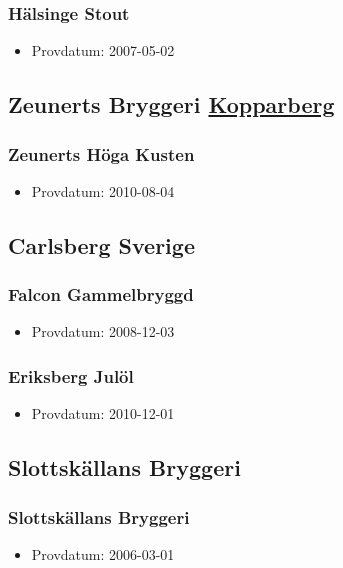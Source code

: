 \documentclass[11pt]{article}
\begin{document}
\subsubsection{Hälsinge Stout}
\label{sec:org5e0b851}
\begin{itemize}
\item Provdatum: 2007-05-02
\end{itemize}
\subsection{Zeunerts Bryggeri \underline{Kopparberg}}
\label{sec:org892e3bc}
\subsubsection{Zeunerts Höga Kusten}
\label{sec:org4fc367e}
\begin{itemize}
\item Provdatum: 2010-08-04
\end{itemize}
\subsection{Carlsberg Sverige}
\label{sec:orgc9a3bf7}
\subsubsection{Falcon Gammelbryggd}
\label{sec:orgd0e38f3}
\begin{itemize}
\item Provdatum: 2008-12-03
\end{itemize}
\subsubsection{Eriksberg Julöl}
\label{sec:org7be2359}
\begin{itemize}
\item Provdatum: 2010-12-01
\end{itemize}
\subsection{Slottskällans Bryggeri}
\label{sec:orgdf06616}
\subsubsection{Slottskällans Bryggeri}
\label{sec:orgae0d6b5}
\begin{itemize}
\item Provdatum: 2006-03-01
\end{itemize}
\end{document}

